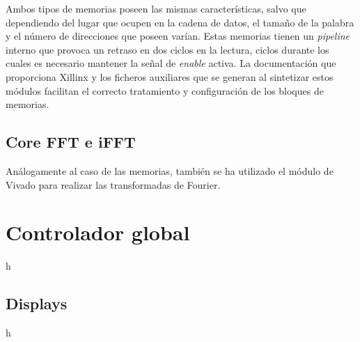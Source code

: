 Ambos tipos de memorias poseen las mismas características, salvo que dependiendo del lugar que ocupen en la cadena de datos, el tamaño de la palabra y el número de direcciones que poseen varían. Estas memorias tienen un \emph{pipeline} interno que provoca un retraso en dos ciclos en la lectura, ciclos durante los cuales es necesario mantener la señal de \emph{enable} activa. La documentación que proporciona Xillinx y los ficheros auxiliares que se generan al sintetizar estos módulos facilitan el correcto tratamiento y configuración de los bloques de memorias.

\subsection{Core FFT e iFFT}
Análogamente al caso de las memorias, también se ha utilizado el módulo de Vivado para realizar las transformadas de Fourier.
\section{Controlador global}
h
\subsection{Displays}
h 